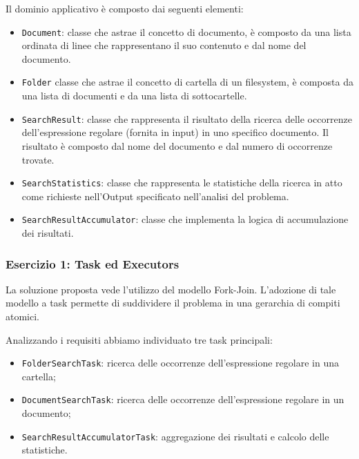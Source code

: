 \documentclass[a4paper]{article}
\begin{document}
Il dominio applicativo \`e composto dai seguenti elementi:

\begin{itemize}
%
    \item \texttt{Document}: classe che astrae il concetto di documento, \`e composto da una lista ordinata di linee che rappresentano il suo contenuto e dal nome del documento.
%
    \item \texttt{Folder} classe che astrae il concetto di cartella di un filesystem, \`e composta da una lista di documenti e da una lista di sottocartelle.
%
    \item \texttt{SearchResult}: classe che rappresenta il risultato della ricerca delle occorrenze dell'espressione regolare (fornita in input) in uno specifico documento.
%
    Il risultato \`e composto dal nome del documento e dal numero di occorrenze trovate.
%
    \item \texttt{SearchStatistics}: classe che rappresenta le statistiche della ricerca in atto come richieste nell'Output specificato nell'analisi del problema.
%
    \item \texttt{SearchResultAccumulator}: classe che implementa la logica di accumulazione dei risultati.
%
\end{itemize}

\subsubsection{Esercizio 1: Task ed Executors}

La soluzione proposta vede l'utilizzo del modello Fork-Join.
%
L'adozione di tale modello a task permette di suddividere il problema in una gerarchia di compiti atomici.

Analizzando i requisiti abbiamo individuato tre task principali:

\begin{itemize}
%
    \item \texttt{FolderSearchTask}: ricerca delle occorrenze dell'espressione regolare in una cartella;
%
    \item \texttt{DocumentSearchTask}: ricerca delle occorrenze dell'espressione regolare in un documento;
%
    \item \texttt{SearchResultAccumulatorTask}: aggregazione dei risultati e calcolo delle statistiche.
%
\end{itemize}
\end{document}
